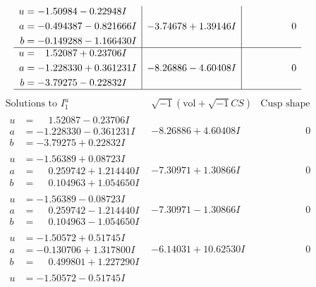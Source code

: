 \documentclass[1p]{elsarticle_modified}
\theoremstyle{definition}
\newcommand{\I}{\sqrt{-1}}
\begin{document}
$$\begin{array}{c|c|c}
\begin{aligned}
u &= -1.50984 - 0.22948 I \\
a &= -0.494387 - 0.821666 I \\
b &= -0.149288 - 1.166430 I\end{aligned}
 & -3.74678 + 1.39146 I & \phantom{-0.000000 } 0 \\ \hline\begin{aligned}
u &= \phantom{-}1.52087 + 0.23706 I \\
a &= -1.228330 + 0.361231 I \\
b &= -3.79275 - 0.22832 I\end{aligned}
 & -8.26886 - 4.60408 I & \phantom{-0.000000 } 0\\
 \hline 
 \end{array}$$\newpage$$\begin{array}{c|c|c}  
\text{Solutions to }I^u_{1}& \I (\text{vol} + \sqrt{-1}CS) & \text{Cusp shape}\\
 \hline 
\begin{aligned}
u &= \phantom{-}1.52087 - 0.23706 I \\
a &= -1.228330 - 0.361231 I \\
b &= -3.79275 + 0.22832 I\end{aligned}
 & -8.26886 + 4.60408 I & \phantom{-0.000000 } 0 \\ \hline\begin{aligned}
u &= -1.56389 + 0.08723 I \\
a &= \phantom{-}0.259742 + 1.214440 I \\
b &= \phantom{-}0.104963 + 1.054650 I\end{aligned}
 & -7.30971 + 1.30866 I & \phantom{-0.000000 } 0 \\ \hline\begin{aligned}
u &= -1.56389 - 0.08723 I \\
a &= \phantom{-}0.259742 - 1.214440 I \\
b &= \phantom{-}0.104963 - 1.054650 I\end{aligned}
 & -7.30971 - 1.30866 I & \phantom{-0.000000 } 0 \\ \hline\begin{aligned}
u &= -1.50572 + 0.51745 I \\
a &= -0.130706 + 1.317800 I \\
b &= \phantom{-}0.499801 + 1.227290 I\end{aligned}
 & -6.14031 + 10.62530 I & \phantom{-0.000000 } 0 \\ \hline\begin{aligned}
u &= -1.50572 - 0.51745 I \\

\end{aligned}
\end{array}$$
\end{document}
